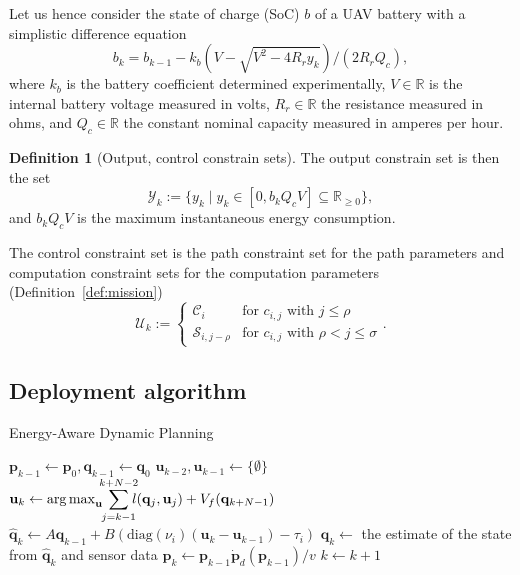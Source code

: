 \documentclass[letterpaper,10pt,conference]{ieeeconf}
\theoremstyle{definition}
\newtheorem{defn}{Definition}[section]
\DeclareMathOperator*{\argmax}{arg\,max}
\begin{document}
Let us hence consider the state of charge (SoC) $b$ of a UAV battery with a simplistic difference equation~\cite{seewald2020mechanical}
\begin{equation*}
  b_k=b_{k-1}-k_b\left(V-
  \sqrt{
    V^2-
    4R_ry_k}
  \right)/(2R_rQ_c),
\end{equation*}
where $k_b$ is the battery coefficient determined experimentally,  $V\in\mathbb{R}$ is the internal battery 
voltage measured in volts, $R_r\in\mathbb{R}$ the resistance measured in ohms, and $Q_c\in\mathbb{R}$ the constant nominal capacity measured in amperes per hour. 

\begin{defn}[Output, control constrain sets]
The output constrain set is then the set
\begin{equation*}
  \mathcal{Y}_k:=\{y_k\mid y_k\in[0,b_kQ_cV]\subseteq{\mathbb{R}_{\geq 0}}\},
\end{equation*}
and $b_kQ_cV$ is the maximum instantaneous energy consumption.

The control constraint set is the path constraint set for the path parameters and computation constraint sets for the computation parameters (Definition~\ref{def:mission})
\begin{equation*}
  \mathcal{U}_k:=\begin{cases}
    \mathcal{C}_i & \text{for } c_{i,j} \text{ with } j\leq\rho\\
    \mathcal{S}_{i,j-\rho} & \text{for } c_{i,j} \text{ with } \rho<j\leq\sigma
  \end{cases}.
\end{equation*}
\end{defn}

\subsection{Deployment algorithm}

\begin{algorithm}[t]
  \caption{Energy-Aware Dynamic Planning}\label{alg}
  \begin{algorithmic}[1]
    \STATE $\mathbf{p}_{k-1}\gets \mathbf{p}_0, \mathbf{q}_{k-1}\gets \mathbf{q}_0$
    \STATE $\mathbf{u}_{k-2},\mathbf{u}_{k-1}\gets \{\emptyset\}$\label{alg:init}
    \label{alg:stages-loop}
        \STATE $\mathbf{u}_k\gets\argmax_{\mathbf{u}}\hspace*{-1ex}{\displaystyle{\sum\limits_{j=k-1}^{k+N-2}}\hspace*{-1ex}{l(\mathbf{q}_j,\mathbf{u}_j)+V_f(\mathbf{q}_{k+N-1})}}$\label{alg:mpc}
        \STATE $\hat{\mathbf{q}}_{k}\gets A\mathbf{q}_{k-1}+B(\mathrm{diag}(\nu_i)(\mathbf{u}_k-\mathbf{u}_{k-1})-\tau_i)$\label{alg:evolution}
        \STATE $\mathbf{q}_{k}\gets$ the estimate of the state from $\hat{\mathbf{q}}_{k}$ and sensor data\label{alg:kalman_end}
        \STATE $\mathbf{p}_{k}\gets\mathbf{p}_{k-1}\dot{\mathbf{p}}_d(\mathbf{p}_{k-1})/v$ \label{alg:pos}
        \STATE $k\gets k+1$
      \ENDWHILE
    \ENDFOR
  \end{algorithmic} 
\end{algorithm}
\end{document}
